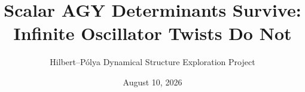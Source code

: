 \documentclass[11pt]{article}
\title{Scalar AGY Determinants Survive:\\
Infinite Oscillator Twists Do Not}
\author{Hilbert--P\'olya Dynamical Structure Exploration Project}
\date{August 10, 2026}
\theoremstyle{definition}
\theoremstyle{remark}
\begin{document}
\maketitle

\begin{abstract}

\end{abstract}













\appendix



\end{document}
